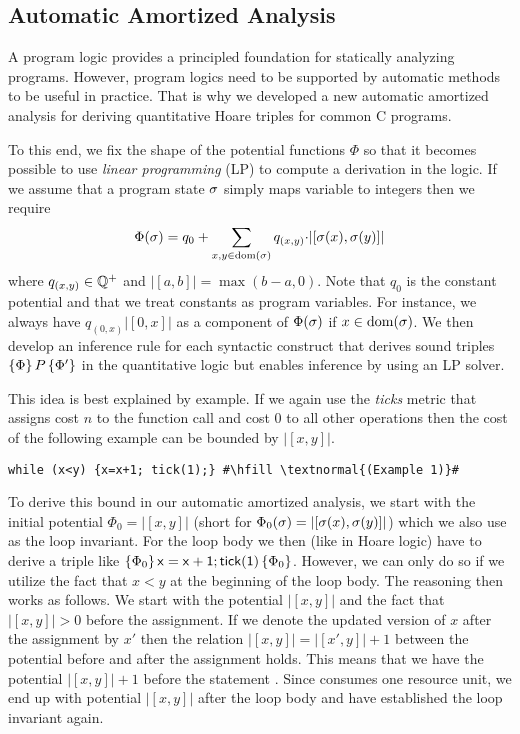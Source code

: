 \documentclass[nocopyrightspace,preprint]{sigplanconf}
\begin{document}
\subsection{Automatic Amortized Analysis}

A program logic provides a principled foundation for statically
analyzing programs.  However, program logics need to be supported by
automatic methods to be useful in practice.  That is why we developed a
new automatic amortized analysis for deriving quantitative Hoare
triples for common C programs.

To this end, we fix the shape of the potential functions $\Phi$ so
that it becomes possible to use \emph{linear programming} (LP) to
compute a derivation in the logic.  If we assume that a program state
$\sigma$ simply maps variable to integers then we require
$$
\Phi(\sigma) = q_0 + \sum_{x,y \in  \text{dom}(\sigma)} q_{(x,y)} {\cdot} |[\sigma(x),\sigma(y)]|
$$
where $q_{(x,y)} \in \mathbb{Q^+}$ and $|[a,b]| = \max(b-a,0)$.  Note that
$q_0$ is the constant potential and that we treat constants as program
variables.  For instance, we always have $q_{(0,x)}|[0,x]|$ as a
component of $\Phi(\sigma)$ if $x \in  \text{dom}(\sigma)$.
%
We then develop an inference rule for each syntactic construct that
derives sound triples $\{\Phi\}\, P\, \{\Phi'\}$ in the quantitative
logic but enables inference by using an LP solver.  

This idea is best explained by example.  If we again use the
\emph{ticks} metric that assigns cost $n$ to the function call
 and cost $0$ to all other operations then the cost of
the following example can be bounded by $|[x,y]|$.
\begin{lstlisting}
while (x<y) {x=x+1; tick(1);} #\hfill \textnormal{(Example 1)}#
\end{lstlisting}
To derive this bound in our automatic amortized analysis, we start
with the initial potential $\Phi_0 = |[x,y]|$ (short for
$\Phi_0(\sigma) = |[\sigma(x),\sigma(y)]|$) which we also use as the
loop invariant.  For the loop body we then (like in Hoare logic) have
to derive a triple like
$\{\Phi_0\}\, \mathsf{x=x+1;tick(1)}\, \{\Phi_0\}$.  However, we can
only do so if we utilize the fact that $x<y$ at the beginning of the
loop body.  The reasoning then works as follows.  We start with the
potential $|[x,y]|$ and the fact that $|[x,y]| > 0$ before the
assignment.  If we denote the updated version of $x$ after the
assignment by $x'$ then the relation $|[x,y]| = |[x',y]| + 1$ between
the potential before and after the assignment  holds.
This means that we have the potential $|[x,y]| + 1$ before the
statement .  Since  consumes one resource unit,
we end up with potential $|[x,y]|$ after the loop body and have
established the loop invariant again.
\end{document}

